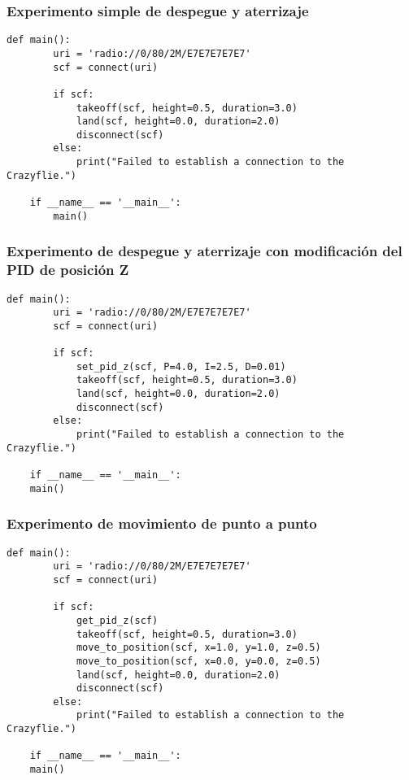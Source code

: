 \subsubsection{Experimento simple de despegue y aterrizaje}
\vspace{2mm} %
\begin{lstlisting}[caption=Algoritmo de prueba de takeoff y land con Crazyflie., label=code:python_prueba1]
	def main():
		uri = 'radio://0/80/2M/E7E7E7E7E7'
		scf = connect(uri)
		
		if scf:
			takeoff(scf, height=0.5, duration=3.0)  
			land(scf, height=0.0, duration=2.0)     
			disconnect(scf)  
		else:
			print("Failed to establish a connection to the Crazyflie.")
	
	if __name__ == '__main__':
		main()
\end{lstlisting}

\newpage
\subsubsection{Experimento de despegue y aterrizaje con modificación del PID de posición Z}
\vspace{2mm} %
\begin{lstlisting}[caption=Algoritmo de prueba de takeoff y land con Crazyflie., label=code:python_prueba2]
	def main():
		uri = 'radio://0/80/2M/E7E7E7E7E7'
		scf = connect(uri)
		
		if scf:
			set_pid_z(scf, P=4.0, I=2.5, D=0.01) 
			takeoff(scf, height=0.5, duration=3.0)  
			land(scf, height=0.0, duration=2.0)     
			disconnect(scf)  
		else:
			print("Failed to establish a connection to the Crazyflie.")
		
	if __name__ == '__main__':
	main()
\end{lstlisting}

\subsubsection{Experimento de movimiento de punto a punto}
\vspace{2mm} %
\begin{lstlisting}[caption=Algoritmo de prueba de takeoff y land con Crazyflie., label=code:python_prueba3]
	def main():
		uri = 'radio://0/80/2M/E7E7E7E7E7'
		scf = connect(uri)
		
		if scf:
			get_pid_z(scf)
			takeoff(scf, height=0.5, duration=3.0)  
			move_to_position(scf, x=1.0, y=1.0, z=0.5)
			move_to_position(scf, x=0.0, y=0.0, z=0.5)
			land(scf, height=0.0, duration=2.0)
			disconnect(scf)    
		else:
			print("Failed to establish a connection to the Crazyflie.")
	
	if __name__ == '__main__':
	main()
\end{lstlisting}

